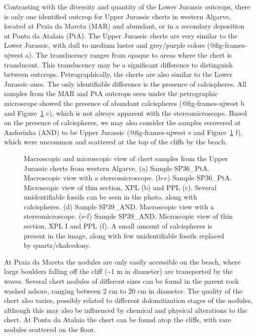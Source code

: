 \documentclass[
  a4paper,
  DIV=11,
  numbers=noendperiod]{scrreprt}
\begin{document}
Contrasting with the diversity and quantity of the Lower Jurassic
outcrops, there is only one identified outcrop for Upper Jurassic cherts
in western Algarve, located at Praia da Mareta (MAR) and abundant, or in
a secondary deposition at Ponta da Atalaia (PtA). The Upper Jurassic
cherts are very similar to the Lower Jurassic, with dull to medium
luster and grey/purple colors (@fig-frames-ujwest a). The translucency
ranges from opaque to areas where the chert is translucent. This
translucency may be a significant difference to distinguish between
outcrops. Petrographically, the cherts are also similar to the Lower
Jurassic ones. The only identifiable difference is the presence of
calcispheres. All samples from the MAR and PtA outcrops seen under the
petrographic microscope showed the presence of abundant calcispheres
(@fig-frames-ujwest b and Figure~\ref{fig-frames-ujwest} c), which is
not always apparent with the stereomicroscope. Based on the presence of
calcispheres, we may also consider the samples recovered at Andorinha
(AND) to be Upper Jurassic (@fig-frames-ujwest e and
Figure~\ref{fig-frames-ujwest} f), which were uncommon and scattered at
the top of the cliffs by the beach.

\begin{figure}


\caption{\label{fig-frames-ujwest}Macroscopic and microscopic view of
chert samples from the Upper Jurassic cherts from western Algarve. (a)
Sample SP36\_PtA. Macroscopic view with a stereomicroscope. (b-c) Sample
SP36\_PtA. Microscopic view of thin section, XPL (b) and PPL (c).
Several unidentifiable fossils can be seen in the photo, along with
calcispheres. (d) Sample SP39\_AND. Macroscopic view with a
stereomicroscope. (e-f) Sample SP39\_AND. Microscopic view of thin
section, XPL I and PPL (f). A small amount of calcispheres is present in
the image, along with few unidentifiable fossils replaced by
quartz/chalcedony.}

\end{figure}%

At Praia da Mareta the nodules are only easily accessible on the beach,
where large boulders falling off the cliff (\textasciitilde1 m in
diameter) are transported by the waves. Several chert nodules of
different sizes can be found in the parent rock washed ashore, ranging
between 2 cm to 20 cm in diameter. The quality of the chert also varies,
possibly related to different dolomitization stages of the nodules,
although this may also be influenced by chemical and physical
alterations to the chert. At Ponta da Atalaia the chert can be found
atop the cliffs, with rare nodules scattered on the floor.
\end{document}
